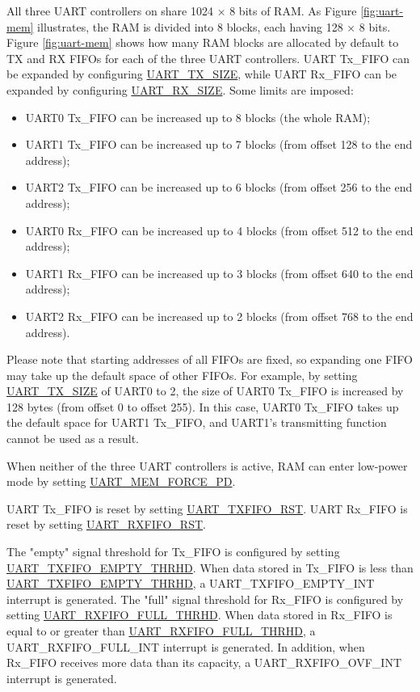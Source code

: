 \documentclass[main\_\_EN.tex]{subfiles}
\begin{document}
All three UART controllers on \chipname{}  share 1024 × 8 bits of RAM. As Figure \ref{fig:uart-mem} illustrates, the RAM is divided into 8 blocks, each having 128 × 8 bits. Figure \ref{fig:uart-mem} shows how many RAM blocks are allocated by default to TX and RX FIFOs for each of the three UART controllers. UART Tx\_FIFO can be expanded by configuring \hyperref[fielddesc:UARTTXSIZE]{UART\_TX\_SIZE}, while UART Rx\_FIFO can be expanded by configuring \hyperref[fielddesc:UARTRXSIZE]{UART\_RX\_SIZE}.
Some limits are imposed:
\begin{itemize}
    \item UART0 Tx\_FIFO can be increased up to 8 blocks (the whole RAM);
    \item UART1 Tx\_FIFO can be increased up to 7 blocks (from offset 128 to the end address);
    \item UART2 Tx\_FIFO can be increased up to 6 blocks (from offset 256 to the end address);
    \item UART0 Rx\_FIFO can be increased up to 4 blocks (from offset 512 to the end address);
    \item UART1 Rx\_FIFO can be increased up to 3 blocks (from offset 640 to the end address);
    \item UART2 Rx\_FIFO can be increased up to 2 blocks (from offset 768 to the end address).
\end{itemize}
Please note that starting addresses of all FIFOs are fixed, so expanding one FIFO may take up the default space of other FIFOs. For example, by setting \hyperref[fielddesc:UARTTXSIZE]{UART\_TX\_SIZE} of UART0 to 2, the size of UART0 Tx\_FIFO is increased by 128 bytes (from offset 0 to offset 255). In this case, UART0 Tx\_FIFO takes up the default space for UART1 Tx\_FIFO, and UART1's transmitting function cannot be used as a result.

When neither of the three UART controllers is active, RAM can enter low-power mode by setting \hyperref[fielddesc:UARTMEMFORCEPD]{UART\_MEM\_FORCE\_PD}.

UART Tx\_FIFO is reset by setting \hyperref[fielddesc:UARTTXFIFORST]{UART\_TXFIFO\_RST}. UART Rx\_FIFO is reset by setting \hyperref[fielddesc:UARTRXFIFORST]{UART\_RXFIFO\_RST}.



The "empty" signal threshold for Tx\_FIFO is configured by setting \hyperref[fielddesc:UARTTXFIFOEMPTYTHRHD]{UART\_TXFIFO\_EMPTY\_THRHD}. When data stored in Tx\_FIFO is less than \hyperref[fielddesc:UARTTXFIFOEMPTYTHRHD]{UART\_TXFIFO\_EMPTY\_THRHD}, a UART\_TXFIFO\_EMPTY\_INT interrupt is generated. The "full" signal threshold for Rx\_FIFO is configured by setting \hyperref[fielddesc:UARTRXFIFOFULLTHRHD]{UART\_RXFIFO\_FULL\_THRHD}. When data stored in Rx\_FIFO is equal to or greater than \hyperref[fielddesc:UARTRXFIFOFULLTHRHD]{UART\_RXFIFO\_FULL\_THRHD}, a UART\_RXFIFO\_FULL\_INT interrupt is generated. In addition, when Rx\_FIFO receives more data than its capacity, a UART\_RXFIFO\_OVF\_INT interrupt is generated.
\end{document}
